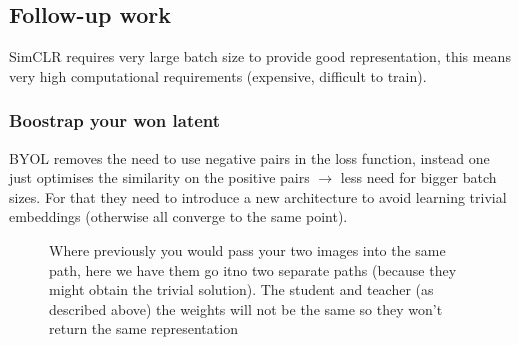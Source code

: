 \documentclass[11pt]{article}
\begin{document}
\subsection{Follow-up work}

SimCLR requires very large batch size to provide good representation, this means very high computational requirements (expensive, difficult to train).

\subsubsection{Boostrap your won latent}

BYOL removes the need to use negative pairs in the loss function, instead one just optimises the similarity on the positive pairs $\rightarrow$ less need for bigger batch sizes. For that they need to introduce a new architecture to avoid learning trivial embeddings (otherwise all converge to the same point).

\begin{figure}[H]
    \centering
    \caption*{Where previously you would pass your two images into the same path, here we have them go itno two separate paths (because they might obtain the trivial solution). The student and teacher (as described above) the weights will not be the same so they won't return the same representation}
\end{figure}
\end{document}
